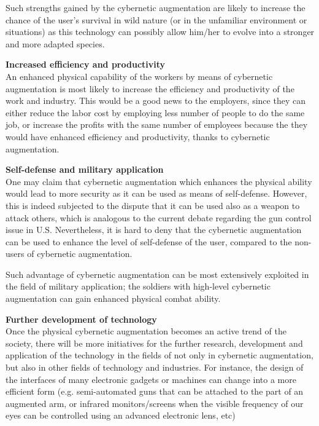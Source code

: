 Such strengths gained by the cybernetic augmentation are likely to increase the chance of the user's survival in wild nature (or in the unfamiliar environment or situations) as this technology can possibly allow him/her to evolve into a stronger and more adapted species. 

{\bf Increased efficiency and productivity}\\
An enhanced physical capability of the workers by means of cybernetic augmentation is most likely to increase the efficiency and productivity of the work and industry. This would be a good news to the employers, since they can either reduce the labor cost by employing less number of people to do the same job, or increase the profits with the same number of employees because the they would have enhanced efficiency and productivity, thanks to cybernetic augmentation.

{\bf Self-defense and military application}\\
One may claim that cybernetic augmentation which enhances the physical ability would lead to more security as it can be used as means of self-defense. However, this is indeed subjected to the dispute that it can be used also as a weapon to attack others, which is analogous to the current debate regarding the gun control issue in U.S. Nevertheless, it is hard to deny that the cybernetic augmentation can be used to enhance the level of self-defense of the user, compared to the non-users of cybernetic augmentation.

Such advantage of cybernetic augmentation can be most extensively exploited in the field of military application; the soldiers with high-level cybernetic augmentation can gain enhanced physical combat ability.

{\bf Further development of technology}\\
Once the physical cybernetic augmentation becomes an active trend of the society, there will be more initiatives for the further research, development and application of the technology in the fields of not only in cybernetic augmentation, but also in other fields of technology and industries. For instance, the design of the interfaces of many electronic gadgets or machines can change into a more efficient form (e.g. semi-automated guns that can be attached to the part of an augmented arm, or infrared monitors/screens when the visible frequency of our eyes can be controlled using an advanced electronic lens, etc)